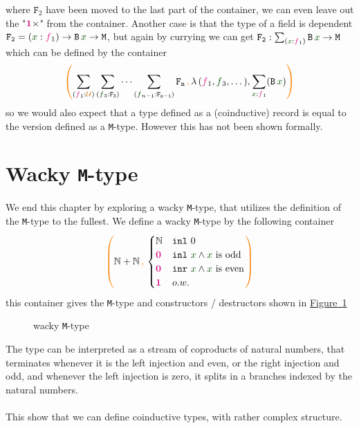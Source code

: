 \documentclass[twoside,11pt,openright]{report}
\theoremstyle{plain} %
\theoremstyle{definition}
\theoremstyle{remark}
\newcommand*{\figref}[1]{\hyperref[fig:#1]{Figure~\ref*{fig:#1}}}
\newcommand*{\term}[1]{\textcolor{green!30!black}{#1}} %
\newcommand*{\type}[1]{\textcolor{magenta!90!black}{#1}}
\newcommand*{\containerpair}[2]{\ensuremath{\colorlet{savedleftcolor}{.}\color{orange}\left(\color{savedleftcolor}#1\,\textcolor{orange}{\mathbf{,}}\,#2\color{orange}\right)\color{savedleftcolor}}}
\newcommand*{\universe}[1]{\textcolor{orange!80!black}{#1}}
\newcommand*{\unit}{\type{\textbf{1}}}
\newcommand*{\empt}{\type{\textbf{0}}}
\newcommand*{\constructor}[1]{\textcolor{purple!60!black}{\ensuremath{\mathtt{#1}}}}
\newcommand*{\destructor}[1]{\textcolor{yellow!60!black}{\ensuremath{\mathtt{#1}}}}
\newcommand*{\typeformer}[1]{\ensuremath{\mathtt{#1}}}
\begin{document}
where \(\typeformer{F}_2\) have been moved to the last part of the container, we can even leave out the "\(\unit \times\)" from the container. Another case is that the type of a field is dependent \(\typeformer{F_2} = (\term{x} : \type{f}_1) \rightarrow \typeformer{B}\,\term{x} \rightarrow \mathtt{M}\), but again by currying we can get \(\typeformer{F_2} : \sum_{(\term{x} : \type{f}_1)} \typeformer{B}\,\term{x} \rightarrow \mathtt{M}\) which can be defined by the container
\begin{equation}
  \containerpair{\sum_{(\type{f}_1 : \universe{\mathcal{U}})} \sum_{(\term{f}_3 : \typeformer{F_3})} \cdots \sum_{(\term{f}_{n-1} : \typeformer{F_{n-1}})}\typeformer{F_n}}{\lambda\,(\type{f}_1,\term{f}_3,\dots),\sum_{\term{x} : \type{f}_1} (\typeformer{B}\,\term{x})}
\end{equation}
so we would also expect that a type defined as a (coinductive) record is equal to the version defined as a \texttt{M}-type. However this has not been shown formally.

\section{Wacky \texttt{M}-type}
We end this chapter by exploring a wacky \texttt{M}-type, that utilizes the definition of the \texttt{M}-type to the fullest. We define a wacky \texttt{M}-type by the following container
\begin{equation}
  \containerpair{\mathbb{N} + \mathbb{N}}{\begin{cases} \mathbb{N} & \mathtt{inl}~0 \\ \empt & \mathtt{inl}~\term{x} \land \term{x}~\text{is odd} \\ \empt & \mathtt{inr}~\term{x} \land \term{x}~\text{is even} \\ \unit & o.w. \end{cases}}
\end{equation}
this container gives the \texttt{M}-type and constructors / destructors shown in \figref{wacky-m-type}
\begin{figure}[h]
  \centering
  \caption{wacky \texttt{M}-type}
  \label{fig:wacky-m-type}
\end{figure}
The type can be interpreted as a stream of coproducts of natural numbers, that terminates whenever it is the left injection and even, or the right injection and odd, and whenever the left injection is zero, it splits in a branches indexed by the natural numbers.
\\ \\
This show that we can define coinductive types, with rather complex structure.
\end{document}
